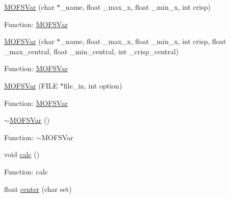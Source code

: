 \begin{DoxyCompactItemize}
\item 
\hyperlink{classMOFSVar_a2034a4a800a68cd19c56662363f429f7}{M\-O\-F\-S\-Var} (char $\ast$\-\_\-name, float \-\_\-max\-\_\-x, float \-\_\-min\-\_\-x, int crisp)
\begin{DoxyCompactList}\small\item\em 

 Function\-: \hyperlink{classMOFSVar}{M\-O\-F\-S\-Var} \end{DoxyCompactList}\item 
\hyperlink{classMOFSVar_a5fd7cb62bbcb7ed9ae03a76078b95b8e}{M\-O\-F\-S\-Var} (char $\ast$\-\_\-name, float \-\_\-max\-\_\-x, float \-\_\-min\-\_\-x, int crisp, float \-\_\-max\-\_\-central, float \-\_\-min\-\_\-central, int \-\_\-crisp\-\_\-central)
\begin{DoxyCompactList}\small\item\em 

 Function\-: \hyperlink{classMOFSVar}{M\-O\-F\-S\-Var} \end{DoxyCompactList}\item 
\hyperlink{classMOFSVar_a67931caa73b4851fabee78776b4a3731}{M\-O\-F\-S\-Var} (F\-I\-L\-E $\ast$file\-\_\-in, int option)
\begin{DoxyCompactList}\small\item\em 

 Function\-: \hyperlink{classMOFSVar}{M\-O\-F\-S\-Var} \end{DoxyCompactList}\item 
\hyperlink{classMOFSVar_ae545b99bdfef5533fc5e293a927660dd}{$\sim$\-M\-O\-F\-S\-Var} ()
\begin{DoxyCompactList}\small\item\em 

 Function\-: $\sim$\-M\-O\-F\-S\-Var \end{DoxyCompactList}\item 
void \hyperlink{classMOFSVar_a8a6959377a7b867d626b0084c3c28985}{calc} ()
\begin{DoxyCompactList}\small\item\em 

 Function\-: calc \end{DoxyCompactList}\item 
float \hyperlink{classMOFSVar_a7a4e701d0c666bfb09831d7f13551819}{center} (char set)
\begin{DoxyCompactList}\small\item\em 


\end{DoxyCompactList}
\end{DoxyCompactItemize}
